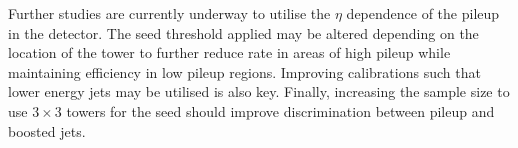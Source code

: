 Further studies are currently underway to utilise the $\eta$ 
dependence of the pileup in the detector.  The seed threshold applied may be altered depending 
on the location of the tower to further reduce rate in areas of high pileup 
while maintaining efficiency in low pileup regions. Improving calibrations such that lower energy jets may 
be utilised is also key. Finally, increasing the sample size to use $3\times3$ towers for 
the seed should improve discrimination between pileup and boosted jets.

